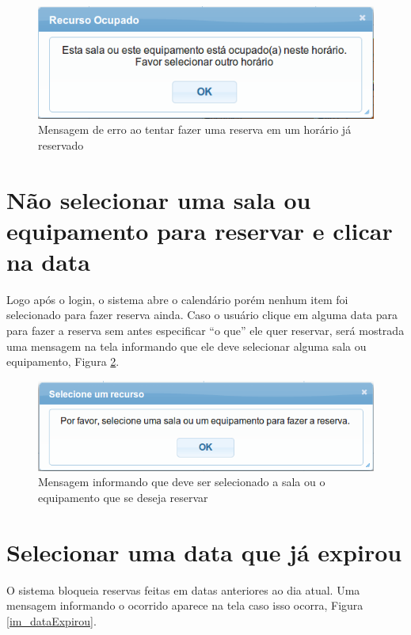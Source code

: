 \documentclass[openany,10pt,a4paper]{book}
\begin{document}
\begin{figure}[!htb]
    \centering
    \includegraphics[scale=0.4]{reservaOcupada.png}
    \caption{Mensagem de erro ao tentar fazer uma reserva em um horário já reservado}
    \label{im_reservaOcupada}
\end{figure}


\section{Não selecionar uma sala ou equipamento para reservar e clicar na data}
Logo após o login, o sistema abre o calendário porém nenhum item foi selecionado para fazer reserva ainda. Caso o usuário clique em alguma data para para fazer a reserva sem antes especificar ``o que'' ele quer reservar, será mostrada uma mensagem na tela informando que ele deve selecionar alguma sala ou equipamento, Figura \ref{im_selecioneSalaEquipamento}.

\begin{figure}[!htb]
    \centering
    \includegraphics[scale=0.4]{selecioneSalaEquipamento.png}
    \caption{Mensagem informando que deve ser selecionado a sala ou o equipamento que se deseja reservar}
    \label{im_selecioneSalaEquipamento}
\end{figure}

\section{Selecionar uma data que já expirou}

O sistema bloqueia reservas feitas em datas anteriores ao dia atual. Uma mensagem informando o ocorrido aparece na tela caso isso ocorra, Figura \ref{im_dataExpirou}.
\end{document}
